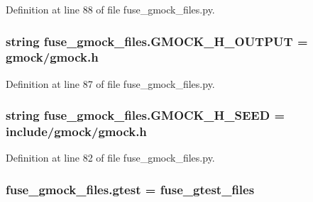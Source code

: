 Definition at line 88 of file fuse\+\_\+gmock\+\_\+files.\+py.

\subsubsection[{\texorpdfstring{G\+M\+O\+C\+K\+\_\+\+H\+\_\+\+O\+U\+T\+P\+UT}{GMOCK_H_OUTPUT}}]{\setlength{\rightskip}{0pt plus 5cm}string fuse\+\_\+gmock\+\_\+files.\+G\+M\+O\+C\+K\+\_\+\+H\+\_\+\+O\+U\+T\+P\+UT = \textquotesingle{}gmock/{\bf gmock.\+h}\textquotesingle{}}\hypertarget{namespacefuse__gmock__files_aba0664abeb60f34cfdf59e8475a465d0}{}\label{namespacefuse__gmock__files_aba0664abeb60f34cfdf59e8475a465d0}


Definition at line 87 of file fuse\+\_\+gmock\+\_\+files.\+py.

\subsubsection[{\texorpdfstring{G\+M\+O\+C\+K\+\_\+\+H\+\_\+\+S\+E\+ED}{GMOCK_H_SEED}}]{\setlength{\rightskip}{0pt plus 5cm}string fuse\+\_\+gmock\+\_\+files.\+G\+M\+O\+C\+K\+\_\+\+H\+\_\+\+S\+E\+ED = \textquotesingle{}include/gmock/{\bf gmock.\+h}\textquotesingle{}}\hypertarget{namespacefuse__gmock__files_aa31b816a9048fb3fa9d482eeac69c139}{}\label{namespacefuse__gmock__files_aa31b816a9048fb3fa9d482eeac69c139}


Definition at line 82 of file fuse\+\_\+gmock\+\_\+files.\+py.

\subsubsection[{\texorpdfstring{gtest}{gtest}}]{\setlength{\rightskip}{0pt plus 5cm}fuse\+\_\+gmock\+\_\+files.\+gtest = fuse\+\_\+gtest\+\_\+files}\hypertarget{namespacefuse__gmock__files_a3fb36dbe8d361f9ecc54e1aa4b94b068}{}\label{namespacefuse__gmock__files_a3fb36dbe8d361f9ecc54e1aa4b94b068}


